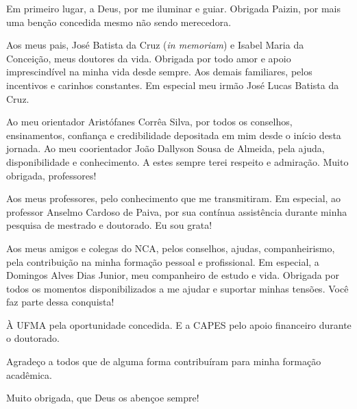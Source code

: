 \begin{agradecimentos}

Em primeiro lugar, a Deus, por me iluminar e guiar. Obrigada Paizin, por mais uma benção concedida mesmo não sendo merecedora.

Aos meus pais, José Batista da Cruz (\textit{in memoriam}) e Isabel Maria da Conceição, meus doutores da vida. Obrigada por todo amor e apoio imprescindível na minha vida desde sempre. Aos demais familiares, pelos incentivos e carinhos constantes. Em especial meu irmão José Lucas Batista da Cruz.

Ao meu orientador Aristófanes Corrêa Silva, por todos os conselhos, ensinamentos, confiança e credibilidade depositada em mim desde o início desta jornada. Ao meu coorientador João Dallyson Sousa de Almeida, pela ajuda, disponibilidade e conhecimento. A estes sempre terei respeito e admiração. Muito obrigada, professores!

Aos meus professores, pelo conhecimento que me transmitiram. Em especial, ao professor Anselmo Cardoso de Paiva, por sua contínua assistência durante minha pesquisa de mestrado e doutorado. Eu sou grata!

Aos meus amigos e colegas do NCA, pelos conselhos, ajudas, companheirismo, pela contribuição na minha formação pessoal e profissional. Em especial, a Domingos Alves Dias Junior, meu companheiro de estudo e vida. Obrigada por todos os momentos disponibilizados a me ajudar e suportar minhas tensões. Você faz parte dessa conquista!

À UFMA pela oportunidade concedida. E a CAPES pelo apoio financeiro durante o doutorado.

Agradeço a todos que de alguma forma contribuíram para minha formação acadêmica.

Muito obrigada, que Deus os abençoe sempre!
 
\end{agradecimentos}
